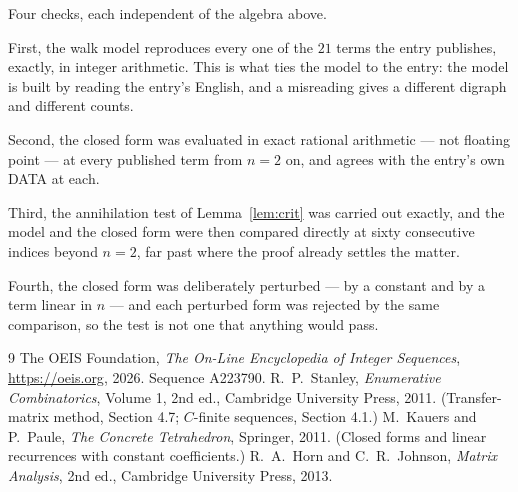 \documentclass[11pt,a4paper]{article}
\theoremstyle{plain}
\theoremstyle{definition}
\begin{document}
Four checks, each independent of the algebra above.

First, the walk model reproduces every one of the $21$ terms the entry publishes,
exactly, in integer arithmetic. This is what ties the model to the entry: the model is built
by reading the entry's English, and a misreading gives a different digraph and different
counts.

Second, the closed form was evaluated in exact rational arithmetic --- not floating point ---
at every published term from $n=2$ on, and agrees with the entry's own DATA at each.

Third, the annihilation test of Lemma~\ref{lem:crit} was carried out exactly, and the model
and the closed form were then compared directly at sixty consecutive indices beyond
$n=2$, far past where the proof already settles the matter.

Fourth, the closed form was deliberately perturbed --- by a constant and by a term linear in
$n$ --- and each perturbed form was rejected by the same comparison, so the test is not one
that anything would pass.

\begin{thebibliography}{9}
 The OEIS Foundation, \emph{The On-Line Encyclopedia of Integer
Sequences}, \url{https://oeis.org}, 2026. Sequence A223790.
 R.~P.~Stanley, \emph{Enumerative Combinatorics}, Volume 1, 2nd ed.,
Cambridge University Press, 2011. (Transfer-matrix method, Section 4.7; $C$-finite sequences,
Section 4.1.)
 M.~Kauers and P.~Paule, \emph{The Concrete Tetrahedron}, Springer, 2011.
(Closed forms and linear recurrences with constant coefficients.)
 R.~A.~Horn and C.~R.~Johnson, \emph{Matrix Analysis}, 2nd ed., Cambridge
University Press, 2013.
\end{thebibliography}
\end{document}
